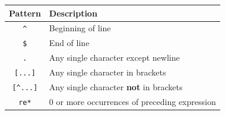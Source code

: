 \documentclass[]{tufte-handout}
\begin{document}
\begin{longtable}[c]{@{}cl@{}}
\toprule
\begin{minipage}[b]{0.17\columnwidth}\centering\strut
Pattern
\strut\end{minipage} &
\begin{minipage}[b]{0.59\columnwidth}\raggedright\strut
Description
\strut\end{minipage}\tabularnewline
\midrule
\endhead
\begin{minipage}[t]{0.17\columnwidth}\centering\strut
\texttt{\^{}}
\strut\end{minipage} &
\begin{minipage}[t]{0.59\columnwidth}\raggedright\strut
Beginning of line
\strut\end{minipage}\tabularnewline
\begin{minipage}[t]{0.17\columnwidth}\centering\strut
\texttt{\$}
\strut\end{minipage} &
\begin{minipage}[t]{0.59\columnwidth}\raggedright\strut
End of line
\strut\end{minipage}\tabularnewline
\begin{minipage}[t]{0.17\columnwidth}\centering\strut
\texttt{.}
\strut\end{minipage} &
\begin{minipage}[t]{0.59\columnwidth}\raggedright\strut
Any single character except newline
\strut\end{minipage}\tabularnewline
\begin{minipage}[t]{0.17\columnwidth}\centering\strut
\texttt{{[}...{]}}
\strut\end{minipage} &
\begin{minipage}[t]{0.59\columnwidth}\raggedright\strut
Any single character in brackets
\strut\end{minipage}\tabularnewline
\begin{minipage}[t]{0.17\columnwidth}\centering\strut
\texttt{{[}\^{}...{]}}
\strut\end{minipage} &
\begin{minipage}[t]{0.59\columnwidth}\raggedright\strut
Any single character \textbf{not} in brackets
\strut\end{minipage}\tabularnewline
\begin{minipage}[t]{0.17\columnwidth}\centering\strut
\texttt{re*}
\strut\end{minipage} &
\begin{minipage}[t]{0.59\columnwidth}\raggedright\strut
0 or more occurrences of preceding expression

\end{minipage}
\end{longtable}
\end{document}
